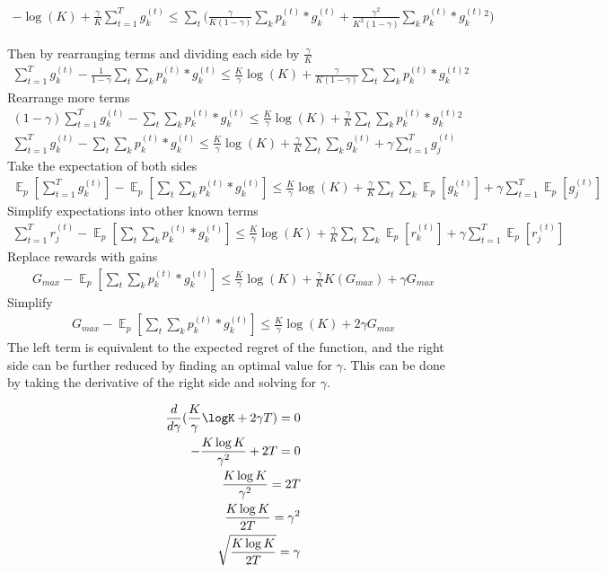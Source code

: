 \documentclass[11pt]{article}
\DeclareMathOperator*{\E}{\mathbb{E}}
\begin{document}
\begin{align}
  -\log(K) + \frac{\gamma}{K}\sum_{t=1}^T g_k^{(t)} \leq \sum_t\big(\frac{\gamma}{K(1-\gamma)}\sum_k p_k^{(t)}*g_k^{(t)}+\frac{\gamma^2}{K^2(1-\gamma)}\sum_k p_k^{(t)}*g_k^{(t)}^2\big)
\end{align}

Then by rearranging terms and dividing each side by $\frac{\gamma}{K}$ 
\begin{align}
  \sum_{t=1}^T g_k^{(t)} - \frac{1}{1-\gamma}\sum_t\sum_k p_k^{(t)}*g_k^{(t)} \leq \frac{K}{\gamma}\log(K) +
  \frac{\gamma}{K(1-\gamma)}\sum_t\sum_k p_k^{(t)}*g_k^{(t)}^2
\end{align}
Rearrange more terms 
\begin{align}
  (1-\gamma)\sum_{t=1}^T g_k^{(t)} - \sum_t\sum_k p_k^{(t)}*g_k^{(t)} \leq 
  \frac{K}{\gamma}\log(K) + \frac{\gamma}{K}\sum_t\sum_k p_k^{(t)}*g_k^{(t)}^2\\
  \sum_{t=1}^T g_k^{(t)} - \sum_t\sum_k p_k^{(t)}*g_k^{(t)} \leq 
  \frac{K}{\gamma}\log(K) + \frac{\gamma}{K}\sum_t\sum_kg_k^{(t)}+\gamma\sum_{t=1}^T g_j^{(t)}
\end{align}
Take the expectation of both sides
\begin{align}
  \E_p[\sum_{t=1}^T g_k^{(t)}] - \E_p[\sum_t\sum_k p_k^{(t)}*g_k^{(t)}] \leq 
  \frac{K}{\gamma}\log(K) + \frac{\gamma}{K}\sum_t\sum_k\E_p[g_k^{(t)}]+\gamma\sum_{t=1}^T\E_p[g_j^{(t)}]
\end{align}
Simplify expectations into other known terms
\begin{align}
  \sum_{t=1}^T r_j^{(t)} - \E_p[\sum_t\sum_k p_k^{(t)}*g_k^{(t)}] \leq 
  \frac{K}{\gamma}\log(K) + \frac{\gamma}{K}\sum_t\sum_k\E_p[r_k^{(t)}]+\gamma\sum_{t=1}^T\E_p[r_j^{(t)}]
\end{align}
Replace rewards with gains
\begin{align}
  G_{max} - \E_p[\sum_t\sum_k p_k^{(t)}*g_k^{(t)}] \leq 
  \frac{K}{\gamma}\log(K) + \frac{\gamma}{K}K(G_{max})+\gamma G_{max}
\end{align}
Simplify
\begin{align}
  G_{max} - \E_p[\sum_t\sum_k p_k^{(t)}*g_k^{(t)}] \leq 
  \frac{K}{\gamma}\log(K) + 2\gamma G_{max}
\end{align}
The left term is equivalent to the expected regret of the function, and the right side can be further reduced by finding an optimal value for $\gamma$. This can be done by taking the derivative of the right side and solving for $\gamma$.

\begin{align}\label{lemma:optimizegamma}
    \frac{d}{d\gamma}(\frac{K}{\gamma}\logK+2\gamma T) = 0\\
    -\frac{K\log K}{\gamma^2}+2T = 0\\
    \frac{K\log K}{\gamma^2}=2T\\
    \frac{K\log K}{2T}=\gamma^2\\
    \sqrt{\frac{K\log K}{2T}}=\gamma
\end{align}
\end{document}
